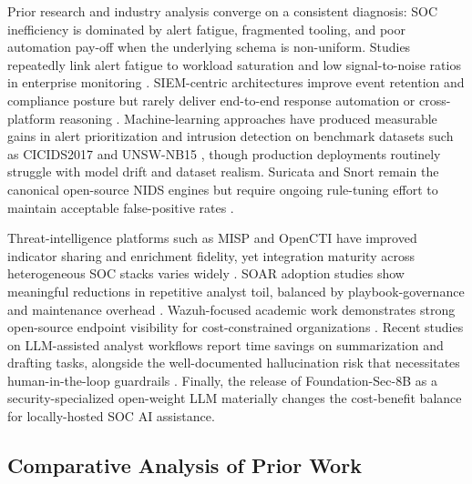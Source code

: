 \documentclass[11pt,a4paper]{article}
\begin{document}
Prior research and industry analysis converge on a consistent diagnosis: SOC inefficiency is dominated by alert fatigue, fragmented tooling, and poor automation pay-off when the underlying schema is non-uniform. Studies repeatedly link alert fatigue to workload saturation and low signal-to-noise ratios in enterprise monitoring \cite{secure2024burnout, vmware2020soc, sans2024survey}. SIEM-centric architectures improve event retention and compliance posture but rarely deliver end-to-end response automation or cross-platform reasoning \cite{nasr2022siem}. Machine-learning approaches have produced measurable gains in alert prioritization and intrusion detection on benchmark datasets such as CICIDS2017 and UNSW-NB15 \cite{sharma2023ml, martinez2021dl}, though production deployments routinely struggle with model drift and dataset realism. Suricata and Snort remain the canonical open-source NIDS engines but require ongoing rule-tuning effort to maintain acceptable false-positive rates \cite{almansoori2024nids}.

Threat-intelligence platforms such as MISP and OpenCTI have improved indicator sharing and enrichment fidelity, yet integration maturity across heterogeneous SOC stacks varies widely \cite{wagner2022ti}. SOAR adoption studies show meaningful reductions in repetitive analyst toil, balanced by playbook-governance and maintenance overhead \cite{collier2023soar}. Wazuh-focused academic work demonstrates strong open-source endpoint visibility for cost-constrained organizations \cite{qureshi2024wazuh}. Recent studies on LLM-assisted analyst workflows report time savings on summarization and drafting tasks, alongside the well-documented hallucination risk that necessitates human-in-the-loop guardrails \cite{nguyen2025llm, darrow2024aisoc}. Finally, the release of Foundation-Sec-8B \cite{cisco2025foundationsec} as a security-specialized open-weight LLM materially changes the cost-benefit balance for locally-hosted SOC AI assistance.

\subsection{Comparative Analysis of Prior Work}
\end{document}
